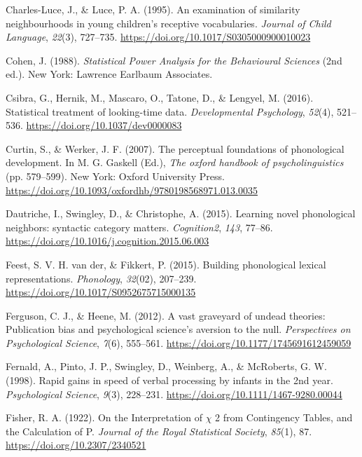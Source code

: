\documentclass[
  english,
  man, noextraspace]{apa6}
\newlength{\cslhangindent}
\newenvironment{cslreferences}%
  {\setlength{\parindent}{0pt}%
  \everypar{\setlength{\hangindent}{\cslhangindent}}\ignorespaces}%
  {\par}
\begin{document}
\begin{cslreferences}
\leavevmode\hypertarget{ref-CharlesLuce1995}{}%
Charles-Luce, J., \& Luce, P. A. (1995). An examination of similarity neighbourhoods in young children's receptive vocabularies. \emph{Journal of Child Language}, \emph{22}(3), 727--735. \url{https://doi.org/10.1017/S0305000900010023}

\leavevmode\hypertarget{ref-cohen}{}%
Cohen, J. (1988). \emph{Statistical Power Analysis for the Behavioural Sciences} (2nd ed.). New York: Lawrence Earlbaum Associates.

\leavevmode\hypertarget{ref-Csibra2016}{}%
Csibra, G., Hernik, M., Mascaro, O., Tatone, D., \& Lengyel, M. (2016). Statistical treatment of looking-time data. \emph{Developmental Psychology}, \emph{52}(4), 521--536. \url{https://doi.org/10.1037/dev0000083}

\leavevmode\hypertarget{ref-Curtin2007}{}%
Curtin, S., \& Werker, J. F. (2007). The perceptual foundations of phonological development. In M. G. Gaskell (Ed.), \emph{The oxford handbook of psycholinguistics} (pp. 579--599). New York: Oxford University Press. \url{https://doi.org/10.1093/oxfordhb/9780198568971.013.0035}

\leavevmode\hypertarget{ref-Dautriche2015}{}%
Dautriche, I., Swingley, D., \& Christophe, A. (2015). Learning novel phonological neighbors: syntactic category matters. \emph{Cognition2}, \emph{143}, 77--86. \url{https://doi.org/10.1016/j.cognition.2015.06.003}

\leavevmode\hypertarget{ref-vanderFeest2015}{}%
Feest, S. V. H. van der, \& Fikkert, P. (2015). Building phonological lexical representations. \emph{Phonology}, \emph{32}(02), 207--239. \url{https://doi.org/10.1017/S0952675715000135}

\leavevmode\hypertarget{ref-Ferguson2012}{}%
Ferguson, C. J., \& Heene, M. (2012). A vast graveyard of undead theories: Publication bias and psychological science's aversion to the null. \emph{Perspectives on Psychological Science}, \emph{7}(6), 555--561. \url{https://doi.org/10.1177/1745691612459059}

\leavevmode\hypertarget{ref-Fernald1998}{}%
Fernald, A., Pinto, J. P., Swingley, D., Weinberg, A., \& McRoberts, G. W. (1998). Rapid gains in speed of verbal processing by infants in the 2nd year. \emph{Psychological Science}, \emph{9}(3), 228--231. \url{https://doi.org/10.1111/1467-9280.00044}

\leavevmode\hypertarget{ref-Fisher1922}{}%
Fisher, R. A. (1922). On the Interpretation of \(\chi\) 2 from Contingency Tables, and the Calculation of P. \emph{Journal of the Royal Statistical Society}, \emph{85}(1), 87. \url{https://doi.org/10.2307/2340521}


\end{cslreferences}
\end{document}
